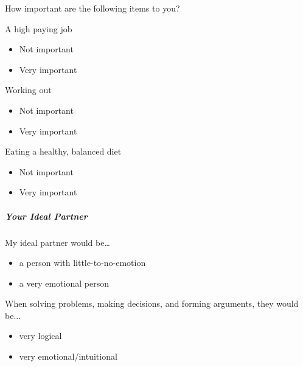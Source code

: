 \documentclass[twoside]{report}
\begin{document}
\begin{multicols}{2}
 How important are the following items to you?

 A high paying job

 \begin{itemize}
  \item
        Not important
 \end{itemize}

 \begin{itemize}
  \item
        Very important
 \end{itemize}

 Working out

 \begin{itemize}
  \item
        Not important
 \end{itemize}

 \begin{itemize}
  \item
        Very important
 \end{itemize}

 Eating a healthy, balanced diet

 \begin{itemize}
  \item
        Not important
 \end{itemize}

 \begin{itemize}
  \item
        Very important
 \end{itemize}

 \subparagraph{Your Ideal Partner}

 My ideal partner would be\ldots{}

 \begin{itemize}
  \item
        a person with little-to-no-emotion
 \end{itemize}

 \begin{itemize}
  \item
        a very emotional person
 \end{itemize}

 When solving problems, making decisions, and forming arguments, they would be...

 \begin{itemize}
  \item
        very logical
 \end{itemize}

 \begin{itemize}
  \item
        very emotional/intuitional
 \end{itemize}


\end{multicols}
\end{document}
